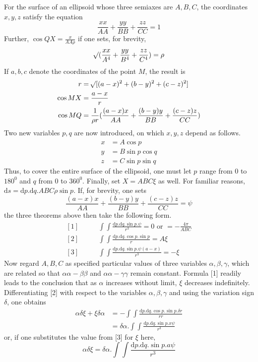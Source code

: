 For the surface of an ellipsoid whose three semiaxes are $A,B,C$, the coordinates $x,y,z$ satisfy the equation
\[
\frac{xx}{AA}+\frac{yy}{BB}+\frac{zz}{CC}=1
\]
Further, $\cos QX=\frac{x}{AA\rho}$ if one sets, for brevity,
\[
\mathord{{}^{}\!\surd}(\frac{xx}{A^4}+\frac{yy}{B^4}+\frac{zz}{C^4})=\rho
\]
If $a,b,c$ denote the coordinates of the point $M$, the result is
\[
\begin{aligned}
r&=\mathord{{}^{}\!\surd}[(a-x)^2+(b-y)^2+(c-z)^2]\\
\cos MX&=\frac{a-x}{r}\\
\cos MQ&=\frac{1}{\rho r}(\frac{(a-x)x}{AA}+\frac{(b-y)y}{BB}+\frac{(c-z)z}{CC})
\end{aligned}
\]
Two new variables $p,q$ are now introduced, on which $x,y,z$ depend as follows.
\[
\begin{aligned}
x&=A\cos p\\
y&=B\sin p\cos q\\
z&=C\sin p\sin q
\end{aligned}
\]
Thus, to cover the entire surface of the ellipsoid, one must let $p$ range from $0$ to $180^0$ and $q$ from $0$ to $360^0$. Finally, set $X=ABC\xi$ as well. For familiar reasons, $\mathrm{d}s=\mathrm{d}p.\mathrm{d}q.ABC\rho\sin p$. If, for brevity, one sets
\[
\frac{(a-x)x}{AA}+\frac{(b-y)y}{BB}+\frac{(c-z)z}{CC}=\psi
\]
the three theorems above then take the following form.
\[
\begin{aligned}
[1]\qquad &\int\int\frac{\mathrm{d}p.\mathrm{d}q.\sin p.\psi}{r^3}=0\text{ or }=-\frac{4\pi}{ABC}\\
[2]\qquad &\int\int\frac{\mathrm{d}p.\mathrm{d}q.\cos p.\sin p}{r}=A\xi\\
[3]\qquad &\int\int\frac{\mathrm{d}p.\mathrm{d}q.\sin p.\psi(a-x)}{r^3}=-\xi
\end{aligned}
\]
Now regard $A,B,C$ as specified particular values of three variables $\alpha,\beta,\gamma$, which are related so that $\alpha\alpha-\beta\beta$ and $\alpha\alpha-\gamma\gamma$ remain constant. Formula [1] readily leads to the conclusion that as $\alpha$ increases without limit, $\xi$ decreases indefinitely. Differentiating [2] with respect to the variables $\alpha,\beta,\gamma$ and using the variation sign $\delta$, one obtains
\[
\begin{aligned}
\alpha\delta\xi+\xi\delta\alpha&=-\int\int\frac{\mathrm{d}p.\mathrm{d}q.\cos p.\sin p.\delta r}{rr}\\
&=\delta\alpha.\int\int\frac{\mathrm{d}p.\mathrm{d}q.\sin p.x\psi}{r^3}
\end{aligned}
\]
or, if one substitutes the value from [3] for $\xi$ here,
\[
\alpha\delta\xi=\delta\alpha.\int\int\frac{\mathrm{d}p.\mathrm{d}q.\sin p.a\psi}{r^3}
\]

